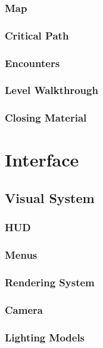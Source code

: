 \documentclass[12pt,titlepage]{article}
\begin{document}
\subsubsection{Map}

\subsubsection{Critical Path}

\subsubsection{Encounters}

\subsubsection{Level Walkthrough}

\subsubsection{Closing Material}


\newpage
\section{Interface}

\subsection{Visual System}

\subsubsection{HUD}

\subsubsection{Menus}

\subsubsection{Rendering System}

\subsubsection{Camera}

\subsubsection{Lighting Models}
\end{document}
